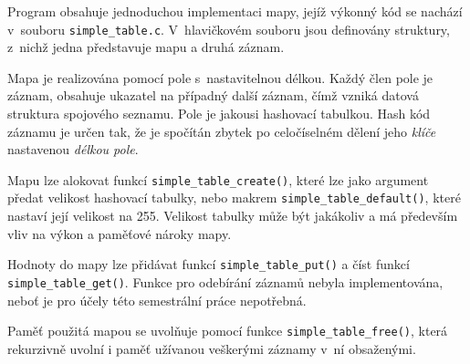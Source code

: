 Program obsahuje jednoduchou implementaci mapy, jejíž výkonný kód se nachází v~souboru \verb|simple_table.c|.
V~hlavičkovém souboru jsou definovány struktury, z~nichž jedna představuje mapu a druhá záznam.

Mapa je realizována pomocí pole s~nastavitelnou délkou. Každý člen pole je záznam, obsahuje ukazatel
na případný další záznam, čímž vzniká datová struktura spojového seznamu. Pole je jakousi hashovací tabulkou. Hash kód
záznamu je určen tak, že je spočítán zbytek po celočíselném dělení jeho \textit{klíče} nastavenou \textit{délkou pole}.

Mapu lze alokovat funkcí \verb|simple_table_create()|, které lze jako argument předat velikost hashovací tabulky, nebo
makrem \verb|simple_table_default()|, které nastaví její velikost na 255. Velikost tabulky může být jakákoliv a má
především vliv na výkon a paměťové nároky mapy.

Hodnoty do mapy lze přidávat funkcí \verb|simple_table_put()| a číst funkcí \verb|simple_table_get()|. Funkce
pro odebírání záznamů nebyla implementována, neboť je pro účely této semestrální práce nepotřebná.

Paměť použitá mapou se uvolňuje pomocí funkce \verb|simple_table_free()|, která rekurzivně uvolní i paměť užívanou
veškerými záznamy v~ní obsaženými.
